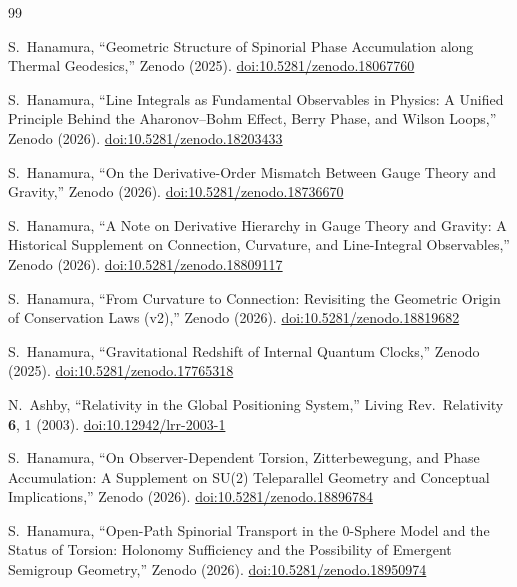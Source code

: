 \documentclass[%
 reprint, amsmath,amssymb, aps, prb, ]{revtex4-2}
\numberwithin{equation}{section}
\begin{document}
\begin{thebibliography}{99}


S.~Hanamura, ``Geometric Structure of Spinorial Phase Accumulation along Thermal Geodesics,'' Zenodo (2025). \href{https://doi.org/10.5281/zenodo.18067760}{doi:10.5281/zenodo.18067760}

S.~Hanamura, ``Line Integrals as Fundamental Observables in Physics: A Unified Principle Behind the Aharonov--Bohm Effect, Berry Phase, and Wilson Loops,'' Zenodo (2026). \href{https://doi.org/10.5281/zenodo.18203433}{doi:10.5281/zenodo.18203433}

S.~Hanamura, ``On the Derivative-Order Mismatch Between Gauge Theory and Gravity,'' Zenodo (2026). \href{https://doi.org/10.5281/zenodo.18736670}{doi:10.5281/zenodo.18736670}

S.~Hanamura, ``A Note on Derivative Hierarchy in Gauge Theory and Gravity: A Historical Supplement on Connection, Curvature, and Line-Integral Observables,'' Zenodo (2026). \href{https://doi.org/10.5281/zenodo.18809117}{doi:10.5281/zenodo.18809117}

S.~Hanamura, ``From Curvature to Connection: Revisiting the Geometric Origin of Conservation Laws (v2),'' Zenodo (2026). \href{https://doi.org/10.5281/zenodo.18819682}{doi:10.5281/zenodo.18819682}

S.~Hanamura, ``Gravitational Redshift of Internal Quantum Clocks,'' Zenodo (2025). \href{https://doi.org/10.5281/zenodo.17765318}{doi:10.5281/zenodo.17765318}

N.~Ashby, ``Relativity in the Global Positioning System,'' Living Rev.\ Relativity \textbf{6}, 1 (2003). \href{https://doi.org/10.12942/lrr-2003-1}{doi:10.12942/lrr-2003-1}

S.~Hanamura, ``On Observer-Dependent Torsion, Zitterbewegung, and Phase Accumulation: A Supplement on SU(2) Teleparallel Geometry and Conceptual Implications,'' Zenodo (2026). \href{https://doi.org/10.5281/zenodo.18896784}{doi:10.5281/zenodo.18896784}

S.~Hanamura, ``Open-Path Spinorial Transport in the 0-Sphere Model and the Status of Torsion: Holonomy Sufficiency and the Possibility of Emergent Semigroup Geometry,'' Zenodo (2026). \href{https://doi.org/10.5281/zenodo.18950974}{doi:10.5281/zenodo.18950974}


\end{thebibliography}
\end{document}

